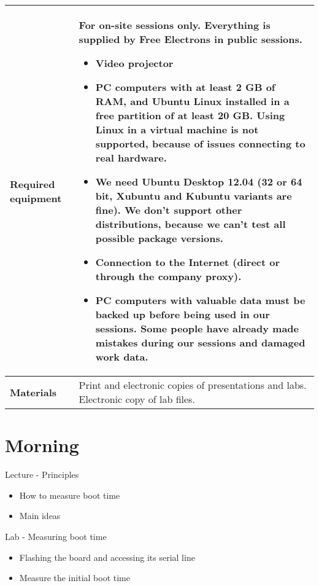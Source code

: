 \documentclass[a4paper,12pt,obeyspaces,spaces,hyphens]{article}
\begin{document}
{\begin{tabularx}{\textwidth}{|g|h|}
    {\bf Required equipment} &
    {\bf For on-site sessions only.}
    \newline Everything is supplied by Free Electrons in public sessions.
    \begin{itemize}
    \item Video projector
    \item PC computers with at least 2 GB of RAM, and Ubuntu Linux
    installed in a {\bf free partition of at least 20 GB. Using Linux
      in a virtual machine is not supported}, because of issues
    connecting to real hardware.
    \item We need Ubuntu Desktop 12.04 (32 or 64 bit, Xubuntu and
    Kubuntu variants are fine). We don't support other
    distributions, because we can't test all possible package versions.
    \item {\bf Connection to the Internet} (direct or through the
    company proxy).
    \item {\bf PC computers with valuable data must be backed up}
    before being used in our sessions.  Some people have already made
    mistakes during our sessions and damaged work data.
    \end{itemize} \\
    \hline

    {\bf Materials} & Print and electronic copies of presentations and
    labs.
    \newline Electronic copy of lab files.\\
    \hline

\end{tabularx}}
\normalsize


\section{Morning}

\feagendatwocolumn
{Lecture - Principles}
{
  \begin{itemize}
  \item How to measure boot time
  \item Main ideas
  \end{itemize}
}
{Lab - Measuring boot time}
{
 \begin{itemize}
 \item Flashing the board and accessing its serial line
 \item Measure the initial boot time 
 \end{itemize}
}
\end{document}
